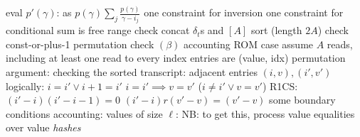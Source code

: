 \begin{outline}
  \2 eval $p'(\gamma)$: 
    \3 as $p(\gamma)\sum_j\frac{p(\gamma)}{\gamma-i_j}$
    \3 one constraint for inversion
    \3 one constraint for conditional
    \3 sum is free
\1 range check
  \2 concat $\delta_t$s and $[A]$
  \2 sort (length $2A$)
  \2 check const-or-plus-1 
  \2 permutation check $(\beta)$ 
\1 accounting
  \2 
\1 ROM case
  \2 assume $A$ reads, including at least one read to every index
  \2 entries are (value, idx)
  \2 permutation argument: 
  \2 checking the sorted transcript:
    \3 adjacent entries $(i, v), (i', v')$
    \3 logically:
      \4 $i = i' \lor i + 1 = i'$
      \4 $i = i' \implies v = v'$ ($i \ne i' \lor v = v'$)
    \3 R1CS:
      \4 $(i'-i)(i'-i-1)=0$
      \4 $(i'-i)r(v'-v)=(v'-v)$
      \4 
    \3 some boundary conditions
  \2 accounting: {\color{purple}{$7\cdot A$}}
    \3 values of size $\ell$: {\color{purple}{$(5 + 2\ell)\cdot A$}}
      \4 NB: to get this, process value equalities over value \textit{hashes}

\end{outline}


